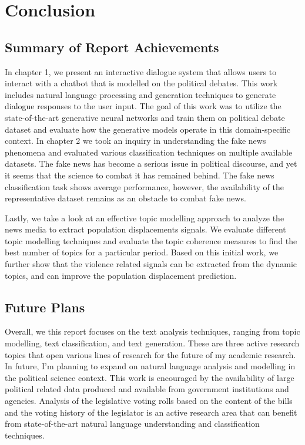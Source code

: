 \chapter{Conclusion}

\label{ch:conclusions}

\section{Summary of Report Achievements}
In chapter 1, we present an interactive dialogue system that allows users to interact with a chatbot that is modelled on the political debates. This work includes natural language processing and generation techniques to generate dialogue responses to the user input. The goal of this work was to utilize the state-of-the-art generative neural networks and train them on political debate dataset and evaluate how the generative models operate in this domain-specific context. In chapter 2 we took an inquiry in understanding the fake news phenomena and evaluated various classification techniques on multiple available datasets. The fake news has become a serious issue in political discourse, and yet it seems that the science to combat it has remained behind. The fake news classification task shows average performance, however, the availability of the representative dataset remains as an obstacle to combat fake news.

Lastly, we take a look at an effective topic modelling approach to analyze the news media to extract population displacements signals. We evaluate different topic modelling techniques and evaluate the topic coherence measures to find the best number of topics for a particular period. Based on this initial work, we further show that the violence related signals can be extracted from the dynamic topics, and can improve the population displacement prediction. 


\section{Future Plans}
Overall, we this report focuses on the text analysis techniques, ranging from topic modelling, text classification, and text generation. These are three active research topics that open various lines of research for the future of my academic research. In future, I'm planning to expand on natural language analysis and modelling in the political science context. This work is encouraged by the availability of large political related data produced and available from government institutions and agencies. Analysis of the legislative voting rolls based on the content of the bills and the voting history of the legislator is an active research area that can benefit from state-of-the-art natural language understanding and classification techniques. 